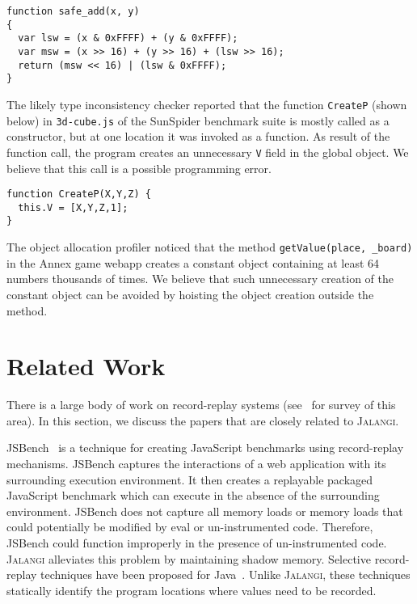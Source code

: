 \documentclass{sig-alternate}
\def\jalangi{\textsc{Jalangi}}
\begin{document}
{\scriptsize
\begin{lstlisting}[mathescape]
function safe_add(x, y)
{
  var lsw = (x & 0xFFFF) + (y & 0xFFFF);
  var msw = (x >> 16) + (y >> 16) + (lsw >> 16);
  return (msw << 16) | (lsw & 0xFFFF);
}
\end{lstlisting}
}

The likely type inconsistency checker reported that the function
\texttt{CreateP} (shown below) in \texttt{3d-cube.js} of the SunSpider
benchmark suite is mostly called as a constructor, but at one location
it was invoked as a function.  As result of the function call, the
program creates an unnecessary \texttt{V} field in the global object.
We believe that this call is a possible programming error.

{\scriptsize
\begin{lstlisting}[mathescape]
function CreateP(X,Y,Z) {
  this.V = [X,Y,Z,1];
}
\end{lstlisting}
}
 
The object allocation profiler noticed that the method
\texttt{getValue(place, \_board)} in the Annex game webapp creates a
constant object containing at least 64 numbers thousands of times.  We
believe that such unnecessary creation of the constant object can be
avoided by hoisting the object creation outside the method.

\section{Related Work}
\label{sec:related-work}

There is a large body of work on record-replay systems
(see~\cite{Cornelis03ataxonomy,Dionne96ataxonomy} for survey of this
area).  In this section, we discuss the papers that are closely
related to \jalangi{}.

JSBench~\cite{Richards:2011:ACJ:2048066.2048119} is a technique for
creating JavaScript benchmarks using record-replay mechanisms.
JSBench captures the interactions of a web application with its
surrounding execution environment.  It then creates a replayable
packaged JavaScript benchmark which can execute in the absence of the
surrounding environment.  JSBench does not capture all memory loads or
memory loads that could potentially be modified by eval or
un-instrumented code.  Therefore, JSBench could function improperly in
the presence of un-instrumented code.  \jalangi{} alleviates this
problem by maintaining shadow memory.  Selective record-replay
techniques have been proposed for
Java~\cite{scarpe,Saff:2005:ATF:1101908.1101927}.  Unlike \jalangi{},
these techniques statically identify the program locations where
values need to be recorded.
\end{document}
